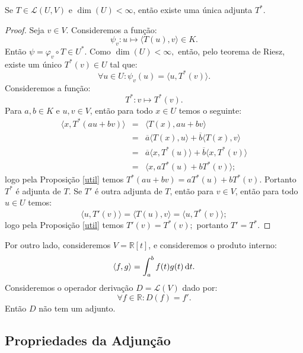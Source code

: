 \documentclass[11pt,twoside,a4paper]{book}
\begin{document}
\begin{teorema}
Se $T\in\mathcal{L}(U,V)$ e $\dim(U)<\infty$, então existe uma única adjunta $T^*$.
\end{teorema}
\begin{proof} Seja $v\in V$. Consideremos a função:
\[
\psi_v:u\mapsto\langle T(u),v\rangle\in K.
\]
Então $\psi=\varphi_v\circ T\in U^*$. Como $\dim(U)<\infty,$ então, pelo teorema de Riesz, existe um único $T^*(v)\in U$ tal que:
\[
\forall u\in U:\psi_v(u)=\langle u,T^*(v)\rangle.
\]
Consideremos a função:
\[
T^*:v\mapsto T^*(v).
\]
Para $a,b\in K$ e $u,v\in V$, então para todo $x\in U$ temos o seguinte:
\[
\begin{array}{rcl}
\langle x,T^*(au+bv)\rangle&=&\langle T(x),au+bv\rangle\\
&=&\overline{a}\langle T(x),u\rangle+\overline{b}\langle T(x),v\rangle\\
&=&\overline{a}\langle x,T^*(u)\rangle+\overline{b}\langle x,T^*(v)\rangle\\
&=&\langle x,aT^*(u)+bT^*(v)\rangle;
\end{array}
\]
logo pela Proposição \ref{util} temos $T^*(au+bv)=aT^*(u)+bT^*(v).$ Portanto $T^*$ é adjunta de $T$. Se $T'$ é outra adjunta de $T$, então para $v\in V$, então para todo $u\in U$ temos:
\[
\langle u,T'(v)\rangle=\langle T(u),v\rangle=\langle u,T^*(v)\rangle;
\] 
logo pela Proposição \ref{util} temos $T'(v)=T^*(v);$ portanto $T'=T^*.$
\end{proof}

\begin{observacao}
Por outro lado, consideremos $V=\mathbb{R}[t]$, e consideremos o produto interno:
\[
\langle f,g\rangle=\int_a^bf(t)g(t)\dif t.
\]
Consideremos o operador derivação $D=\mathcal{L}(V)$ dado por:
\[
\forall f\in\mathbb{R}:D(f)=f'.
\]
Então $D$ não tem um adjunto.
\end{observacao}

\subsection{Propriedades da Adjunção}
\end{document}
